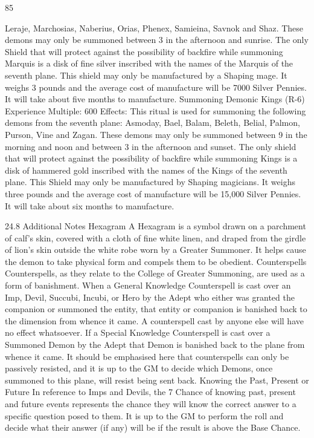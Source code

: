 \documentclass[a4paper]{article}
\begin{document}
\begin{multicols}{3}
85

Leraje, Marchosias, Naberius, Orias, Phenex,
Samieina, Savnok and Shaz. These demons may
only be summoned between 3 in the afternoon and
sunrise.
The only Shield that will protect against the possibility of backfire while summoning Marquis is a
disk of fine silver inscribed with the names of the
Marquis of the seventh plane. This shield may only
be manufactured by a Shaping mage. It weighs 3
pounds and the average cost of manufacture will be
7000 Silver Pennies. It will take about five months
to manufacture.
Summoning Demonic Kings (R-6)
Experience Multiple: 600
Effects: This ritual is used for summoning the
following demons from the seventh plane: Asmoday, Bael, Balam, Beleth, Belial, Palmon, Purson,
Vine and Zagan. These demons may only be summoned between 9 in the morning and noon and
between 3 in the afternoon and sunset.
The only shield that will protect against the possibility of backfire while summoning Kings is a disk
of hammered gold inscribed with the names of the
Kings of the seventh plane. This Shield may only
be manufactured by Shaping magicians. It weighs
three pounds and the average cost of manufacture
will be 15,000 Silver Pennies. It will take about six
months to manufacture.

24.8 Additional Notes
Hexagram
A Hexagram is a symbol drawn on a parchment of
calf’s skin, covered with a cloth of fine white linen,
and draped from the girdle of lion’s skin outside
the white robe worn by a Greater Summoner. It
helps cause the demon to take physical form and
compels them to be obedient.
Counterspells
Counterspells, as they relate to the College of
Greater Summoning, are used as a form of banishment. When a General Knowledge Counterspell is
cast over an Imp, Devil, Succubi, Incubi, or Hero
by the Adept who either was granted the companion or summoned the entity, that entity or companion is banished back to the dimension from whence
it came. A counterspell cast by anyone else will
have no effect whatsoever. If a Special Knowledge
Counterspell is cast over a Summoned Demon by
the Adept that Demon is banished back to the plane
from whence it came. It should be emphasised here
that counterspells can only be passively resisted,
and it is up to the GM to decide which Demons,
once summoned to this plane, will resist being sent
back.
Knowing the Past, Present or Future
In reference to Imps and Devils, the 7%
Chance of knowing past, present and future events
represents the chance they will know the correct
answer to a specific question posed to them. It is
up to the GM to perform the roll and decide what
their answer (if any) will be if the result is above
the Base Chance.


\end{multicols}
\end{document}
